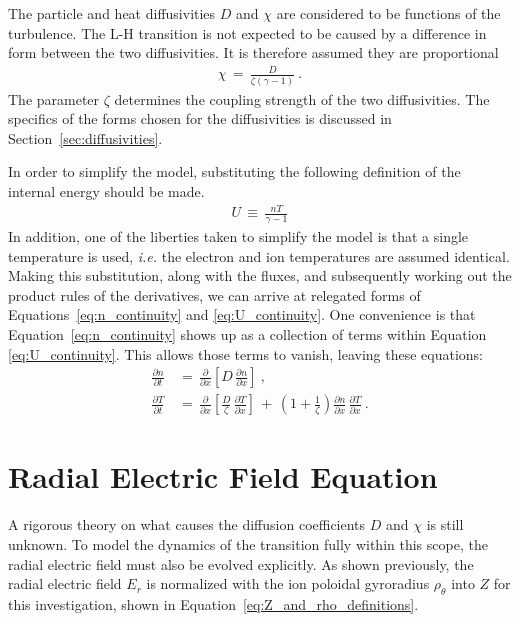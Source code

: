 The particle and heat diffusivities $D$ and $\chi$ are considered to be functions of the turbulence.
The L-H transition is not expected to be caused by a difference in form between the two diffusivities.
It is therefore assumed they are proportional
\begin{align} %
	\chi \,=\, \frac{D}{\zeta (\gamma - 1)} \label{eq:heat_particle_diff_relation}~.
\end{align}
The parameter $\zeta$ determines the coupling strength of the two diffusivities. The specifics of the forms chosen for the diffusivities is discussed in Section~\ref{sec:diffusivities}.

In order to simplify the model, substituting the following definition of the internal energy should be made.
\begin{align} %
	U \,\equiv\, \frac{n T}{\gamma - 1} \label{eq:U_definition}
\end{align}
In addition, one of the liberties taken to simplify the model is that a single temperature is used, \emph{i.e.} the electron and ion temperatures are assumed identical.
Making this substitution, along with the fluxes, and subsequently working out the product rules of the derivatives, we can arrive at relegated forms of Equations~\ref{eq:n_continuity} and \ref{eq:U_continuity}.
One convenience is that Equation~\ref{eq:n_continuity} shows up as a collection of terms within Equation \ref{eq:U_continuity}.
This allows those terms to vanish, leaving these equations:
\begin{align} %
	\frac{\partial n}{\partial t} \,&=\, \frac{\partial}{\partial x} \left[D \,
		\frac{\partial n}{\partial x}\right]~,\label{eq:n_compact} \\
	\frac{\partial T}{\partial t} \,&=\, \frac{\partial}{\partial x} \left[\frac{D}{\zeta} 
		\, \frac{\partial T}{\partial x}\right] \,+\,
		\left(1 + \frac{1}{\zeta}\right) \frac{\partial n}{\partial x} \,
		\frac{\partial T}{\partial x}~. \label{eq:T_compact}
\end{align}

\section{Radial Electric Field Equation}\label{sec:Z_equation}
A rigorous theory on what causes the diffusion coefficients $D$ and $\chi$ is still unknown.
To model the dynamics of the transition fully within this scope, the radial electric field must also be evolved explicitly.
As shown previously, the radial electric field $E_r$ is normalized with the ion poloidal gyroradius $\rho_\theta$ into $Z$ for this investigation, shown in Equation~\ref{eq:Z_and_rho_definitions}.

